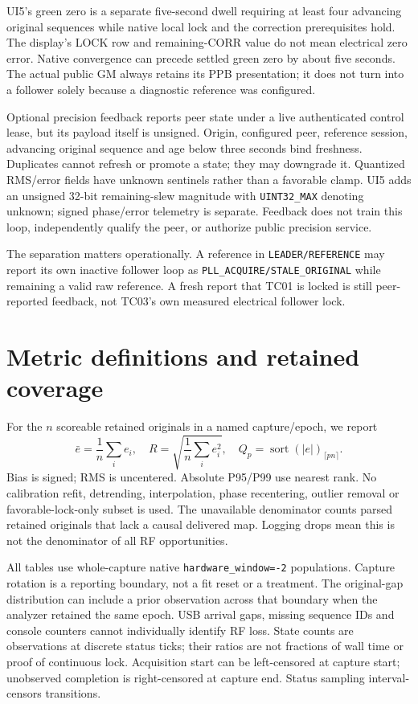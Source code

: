\documentclass[11pt,letterpaper]{article}
\newcommand{\code}[1]{\texttt{\small #1}}
\begin{document}
UI5's green zero is a separate five-second dwell requiring at least four advancing original sequences while native local lock and the correction prerequisites hold. The display's LOCK row and remaining-CORR value do not mean electrical zero error. Native convergence can precede settled green zero by about five seconds. The actual public GM always retains its PPB presentation; it does not turn into a follower solely because a diagnostic reference was configured.

Optional precision feedback reports peer state under a live authenticated control lease, but its payload itself is unsigned. Origin, configured peer, reference session, advancing original sequence and age below three seconds bind freshness. Duplicates cannot refresh or promote a state; they may downgrade it. Quantized RMS/error fields have unknown sentinels rather than a favorable clamp. UI5 adds an unsigned 32-bit remaining-slew magnitude with \code{UINT32\_MAX} denoting unknown; signed phase/error telemetry is separate. Feedback does not train this loop, independently qualify the peer, or authorize public precision service.

The separation matters operationally. A reference in \code{LEADER/REFERENCE} may report its own inactive follower loop as \code{PLL\_ACQUIRE/STALE\_ORIGINAL} while remaining a valid raw reference. A fresh report that TC01 is locked is still peer-reported feedback, not TC03's own measured electrical follower lock.

\section{Metric definitions and retained coverage}
For the $n$ scoreable retained originals in a named capture/epoch, we report
\begin{equation}
 \bar e=\frac1n\sum_i e_i,\quad R=\sqrt{\frac1n\sum_i e_i^2},\quad Q_p=\operatorname{sort}(|e|)_{\lceil pn\rceil}.\label{eq:metrics}
\end{equation}
Bias is signed; RMS is uncentered. Absolute P95/P99 use nearest rank. No calibration refit, detrending, interpolation, phase recentering, outlier removal or favorable-lock-only subset is used. The unavailable denominator counts parsed retained originals that lack a causal delivered map. Logging drops mean this is not the denominator of all RF opportunities.

All tables use whole-capture native \code{hardware\_window=-2} populations. Capture rotation is a reporting boundary, not a fit reset or a treatment. The original-gap distribution can include a prior observation across that boundary when the analyzer retained the same epoch. USB arrival gaps, missing sequence IDs and console counters cannot individually identify RF loss. State counts are observations at discrete status ticks; their ratios are not fractions of wall time or proof of continuous lock. Acquisition start can be left-censored at capture start; unobserved completion is right-censored at capture end. Status sampling interval-censors transitions.
\end{document}
